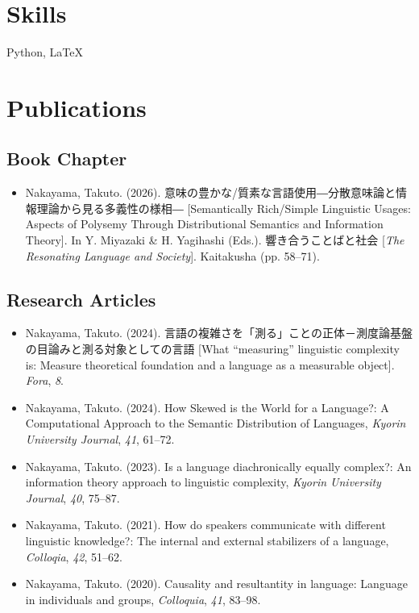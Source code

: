 \documentclass[a4paper,11pt]{article}
\begin{document}
\vspace{1em}

\section*{Skills}
  \hspace{0.5em} Python, \LaTeX

\vspace{1em}

\section*{Publications}
\subsection*{Book Chapter}
\begin{itemize}[leftmargin=*, itemsep=0em, topsep=0em]
  \item Nakayama, Takuto. (2026). 意味の豊かな/質素な言語使用―分散意味論と情報理論から見る多義性の様相― [Semantically Rich/Simple Linguistic Usages: Aspects of Polysemy Through Distributional Semantics and Information Theory]. In Y. Miyazaki \& H. Yagihashi (Eds.). 響き合うことばと社会 [\textit{The Resonating Language and Society}]. Kaitakusha (pp. 58--71).
\end{itemize}

\vspace{1em}

\subsection*{Research Articles}
\begin{itemize}[leftmargin=*, itemsep=0em, topsep=0em]
  \item Nakayama, Takuto. (2024). 言語の複雑さを「測る」ことの正体－測度論基盤の目論みと測る対象としての言語 [What ``measuring'' linguistic complexity is: Measure theoretical foundation and a language as a measurable object]. \textit{Fora}, \textit{8}. 
  \item  Nakayama, Takuto. (2024). How Skewed is the World for a Language?: A Computational Approach to the Semantic Distribution of Languages, \textit{Kyorin University Journal}, \textit{41}, 61–72. 
  \item Nakayama, Takuto. (2023). Is a language diachronically equally complex?: An information theory approach to linguistic complexity, \textit{Kyorin University Journal}, \textit{40}, 75–87. 
  \item Nakayama, Takuto. (2021). How do speakers communicate with different linguistic knowledge?: The internal and external stabilizers of a language, \textit{Colloqia}, \textit{42}, 51–62.
  \item Nakayama, Takuto. (2020). Causality and resultantity in language: Language in individuals and groups, \textit{Colloquia}, \textit{41}, 83–98.
\end{itemize}
\end{document}
